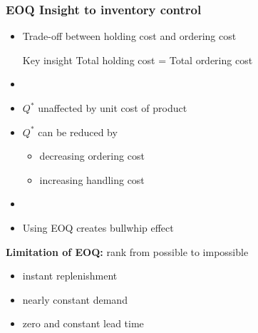 \documentclass[10pt,handout,notes=show]{beamer}
\begin{document}
  \begin{frame}
  \frametitle{EOQ Insight to inventory control}

  \begin{itemize}
    \item Trade-off between \alert{holding cost} and \alert{ordering cost}
    \begin{minipage}{0.8\textwidth}
      \begin{alertblock}{\small{Key insight}}{}
        Total holding cost = Total ordering cost
      \end{alertblock}
    \end{minipage}
    \item[]
    \item $Q^{*}$ \alert{unaffected} by unit cost of product
    \item $Q^{*}$ can be reduced by
    \begin{minipage}{0.8\textwidth}
      \begin{block}{}{}
      \begin{itemize}
        \item<2-> decreasing \alert{ordering cost} 
        \item<2-> increasing handling cost 
      \end{itemize}
      \end{block}
    \end{minipage}
    \item[]


    \item Using EOQ creates \alert{bullwhip effect}
  \end{itemize}

  \NextLine
  \textbf{Limitation of EOQ:} rank from possible to impossible
  \begin{itemize}
    \item<3-> instant replenishment
    \item<3-> nearly constant demand
    \item<3-> zero and constant lead time
  \end{itemize}


\end{frame}
\end{document}
